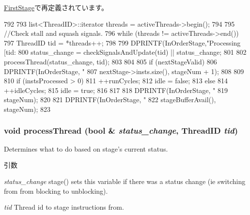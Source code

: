 \hyperlink{classFirstStage_a0782fca2c80ef367ee914d464584ab20}{FirstStage}で再定義されています。


\begin{DoxyCode}
792 {
793     list<ThreadID>::iterator threads = activeThreads->begin();
794 
795     //Check stall and squash signals.
796     while (threads != activeThreads->end()) {
797         ThreadID tid = *threads++;
798 
799         DPRINTF(InOrderStage,"Processing [tid:%
800         status_change =  checkSignalsAndUpdate(tid) || status_change;
801 
802         processThread(status_change, tid);
803     }
804 
805     if (nextStageValid) {
806         DPRINTF(InOrderStage, "%
807                 nextStage->insts.size(), stageNum + 1);
808     }
809 
810     if (instsProcessed > 0) {
811         ++runCycles;
812         idle = false;        
813     } else {
814         ++idleCycles;        
815         idle = true;        
816     }
817     
818     DPRINTF(InOrderStage, "%
819             stageNum);
820 
821     DPRINTF(InOrderStage, "%
822             stageBufferAvail(), stageNum);
823 }
\end{DoxyCode}
\hypertarget{classPipelineStage_a3e391d45d3f6411be62510f3b23105c9}{
\subsubsection[{processThread}]{\setlength{\rightskip}{0pt plus 5cm}void processThread (bool \& {\em status\_\-change}, \/  {\bf ThreadID} {\em tid})}}
\label{classPipelineStage_a3e391d45d3f6411be62510f3b23105c9}
Determines what to do based on stage's current status. 
\begin{DoxyParams}{引数}
\item[{\em status\_\-change}]stage() sets this variable if there was a status change (ie switching from from blocking to unblocking). \item[{\em tid}]Thread id to stage instructions from. \end{DoxyParams}



